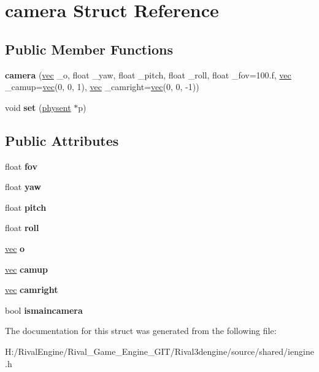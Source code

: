 \hypertarget{structcamera}{}\section{camera Struct Reference}
\label{structcamera}
\subsection*{Public Member Functions}
\begin{DoxyCompactItemize}
\item 
\mbox{\label{structcamera_ac0b8515720cc8b25f619b1945887d16a}} 
{\bfseries camera} (\hyperlink{structvec}{vec} \+\_\+o, float \+\_\+yaw, float \+\_\+pitch, float \+\_\+roll, float \+\_\+fov=100.f, \hyperlink{structvec}{vec} \+\_\+camup=\hyperlink{structvec}{vec}(0, 0, 1), \hyperlink{structvec}{vec} \+\_\+camright=\hyperlink{structvec}{vec}(0, 0, -\/1))
\item 
\mbox{\label{structcamera_a01332747974e1fbb4248ff011245e79e}} 
void {\bfseries set} (\hyperlink{structphysent}{physent} $\ast$p)
\end{DoxyCompactItemize}
\subsection*{Public Attributes}
\begin{DoxyCompactItemize}
\item 
\mbox{\label{structcamera_a987d907bf3fccfc8d9808fb94e120d09}} 
float {\bfseries fov}
\item 
\mbox{\label{structcamera_a74e34a08c03440567bda9f19692d016f}} 
float {\bfseries yaw}
\item 
\mbox{\label{structcamera_af6384e3d97ab75601614169ef9e04971}} 
float {\bfseries pitch}
\item 
\mbox{\label{structcamera_a43b737a022659107e62337f23da0608c}} 
float {\bfseries roll}
\item 
\mbox{\label{structcamera_a46c48ee4ec649b5862c56c9efb893b03}} 
\hyperlink{structvec}{vec} {\bfseries o}
\item 
\mbox{\label{structcamera_a4a28be589814f3b5a244777c4716b221}} 
\hyperlink{structvec}{vec} {\bfseries camup}
\item 
\mbox{\label{structcamera_a820756d714bf43161bc2540f37e7c7c5}} 
\hyperlink{structvec}{vec} {\bfseries camright}
\item 
\mbox{\label{structcamera_add3c764468e46b7856f9564add71b126}} 
bool {\bfseries ismaincamera}
\end{DoxyCompactItemize}


The documentation for this struct was generated from the following file\+:\begin{DoxyCompactItemize}
\item 
H\+:/\+Rival\+Engine/\+Rival\+\_\+\+Game\+\_\+\+Engine\+\_\+\+G\+I\+T/\+Rival3dengine/source/shared/iengine.\+h\end{DoxyCompactItemize}
